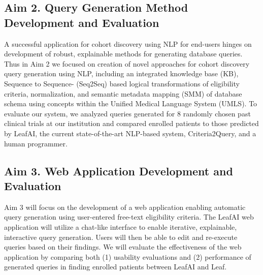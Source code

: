 \documentclass[../main.tex]{subfiles}
\begin{document}
\subsection{Aim 2. Query Generation Method Development and Evaluation}
A successful application for cohort discovery using NLP for end-users hinges on development of robust, explainable methods for generating database queries. Thus in Aim 2 we focused on creation of novel approaches for cohort discovery query generation using NLP, including an integrated knowledge base (KB), Sequence to Sequence- (Seq2Seq) based logical transformations of eligibility criteria, normalization, and semantic metadata mapping (SMM) of database schema using concepts within the Unified Medical Language System (UMLS). To evaluate our system, we analyzed queries generated for 8 randomly chosen past clinical trials at our institution and compared enrolled patients to those predicted by LeafAI, the current state-of-the-art NLP-based system, Criteria2Query, and a human programmer.

\subsection{Aim 3. Web Application Development and Evaluation}
Aim 3 will focus on the development of a web application enabling automatic query generation using user-entered free-text eligibility criteria. The LeafAI web application will utilize a chat-like interface to enable iterative, explainable, interactive query generation. Users will then be able to edit and re-execute queries based on their findings. We will evaluate the effectiveness of the web application by comparing both (1) usability evaluations and (2) performance of generated queries in finding enrolled patients between LeafAI and Leaf.

\newpage
\end{document}
